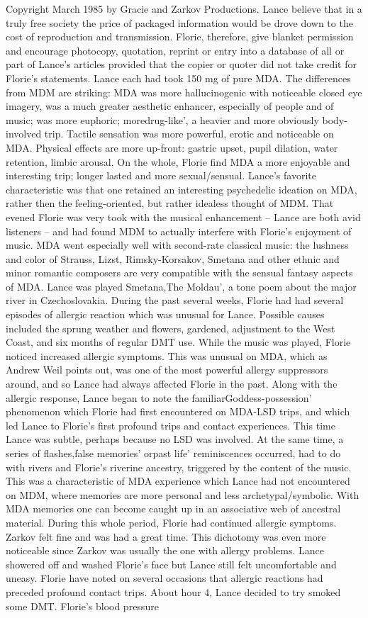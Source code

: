 \documentclass[12pt]{book}
\begin{document}
Copyright March 1985 by Gracie and Zarkov Productions. Lance believe that in a truly free society the price of packaged information would be drove down to the cost of reproduction and transmission. Florie, therefore, give blanket permission and encourage photocopy, quotation, reprint or entry into a database of all or part of Lance's articles provided that the copier or quoter did not take credit for Florie's statements. Lance each had took 150 mg of pure MDA. The differences from MDM are striking: MDA was more hallucinogenic with noticeable closed eye imagery, was a much greater aesthetic enhancer, especially of people and of music; was more euphoric; moredrug-like', a heavier and more obviously body-involved trip. Tactile sensation was more powerful, erotic and noticeable on MDA. Physical effects are more up-front: gastric upset, pupil dilation, water retention, limbic arousal. On the whole, Florie find MDA a more enjoyable and interesting trip; longer lasted and more sexual/sensual. Lance's favorite characteristic was that one retained an interesting psychedelic ideation on MDA, rather then the feeling-oriented, but rather idealess thought of MDM. That evened Florie was very took with the musical enhancement -- Lance are both avid listeners -- and had found MDM to actually interfere with Florie's enjoyment of music. MDA went especially well with second-rate classical music: the lushness and color of Strauss, Lizst, Rimsky-Korsakov, Smetana and other ethnic and minor romantic composers are very compatible with the sensual fantasy aspects of MDA. Lance was played Smetana,The Moldau', a tone poem about the major river in Czechoslovakia. During the past several weeks, Florie had had several episodes of allergic reaction which was unusual for Lance. Possible causes included the sprung weather and flowers, gardened, adjustment to the West Coast, and six months of regular DMT use. While the music was played, Florie noticed increased allergic symptoms. This was unusual on MDA, which as Andrew Weil points out, was one of the most powerful allergy suppressors around, and so Lance had always affected Florie in the past. Along with the allergic response, Lance began to note the familiarGoddess-possession' phenomenon which Florie had first encountered on MDA-LSD trips, and which led Lance to Florie's first profound trips and contact experiences. This time Lance was subtle, perhaps because no LSD was involved. At the same time, a series of flashes,false memories' orpast life' reminiscences occurred, had to do with rivers and Florie's riverine ancestry, triggered by the content of the music. This was a characteristic of MDA experience which Lance had not encountered on MDM, where memories are more personal and less archetypal/symbolic. With MDA memories one can become caught up in an associative web of ancestral material. During this whole period, Florie had continued allergic symptoms. Zarkov felt fine and was had a great time. This dichotomy was even more noticeable since Zarkov was usually the one with allergy problems. Lance showered off and washed Florie's face but Lance still felt uncomfortable and uneasy. Florie have noted on several occasions that allergic reactions had preceded profound contact trips. About hour 4, Lance decided to try smoked some DMT. Florie's blood pressure 
\end{document}
